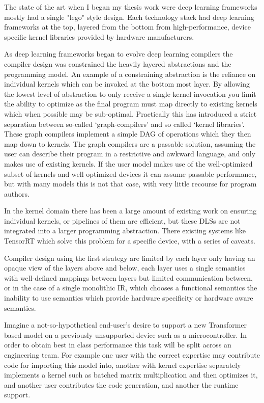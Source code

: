 The state of the art when I began my thesis work were
  deep learning frameworks mostly had a single "lego" style design.
Each technology stack had deep learning frameworks at the top,
  layered from the bottom from high-performance,
  device specific kernel libraries provided by hardware manufacturers.

As deep learning frameworks began to evolve deep learning compilers
  the compiler design was constrained the heavily layered abstractions
  and the programming model.
An example of a constraining abstraction is the reliance on individual
  kernels which can be invoked at the bottom most layer.
By allowing the lowest level of abstraction to only receive a single
  kernel invocation you limit the ability to optimize as the final
  program must map directly to existing kernels which when possible
  may be sub-optimal.
Practically this has introduced a strict separation between so-called
  ‘graph-compilers’ and so called ‘kernel libraries’.
These graph compilers implement a simple DAG of operations
  which they then map down to kernels.
The graph compilers are a passable solution, assuming the user can describe their program in a restrictive and awkward language,
  and only makes use of existing kernels.
If the user model makes use of the well-optimized subset of kernels and well-optimized devices it can assume passable performance,
  but with many models this is not that case, with very little recourse for program authors.

In the kernel domain there has been a large amount of existing work on
  ensuring individual kernels, or pipelines of them are efficient,
  but these DLSs are not integrated into a larger programming abstraction.
There existing systems like TensorRT which solve this problem for a specific device,
with a series of caveats.

Compiler design using the first strategy are limited by each layer only having an opaque view of the layers above and below,
each layer uses a single semantics with well-defined mappings between layers but limited communication between,
 or in the case of a single monolithic IR, which chooses a functional semantics the inability to use semantics which provide
 hardware specificity or hardware aware semantics.

Imagine a not-so-hypothetical end-user’s desire to support a new Transformer based model on a previously unsupported device such as a microcontroller.
In order to obtain best in class performance this task will be split across an engineering team.
For example one user with the correct expertise may contribute code for importing this model into, another with kernel expertise separately implements
a kernel such as batched matrix multiplication and then optimizes it, and another user contributes the code generation, and another the runtime support.

